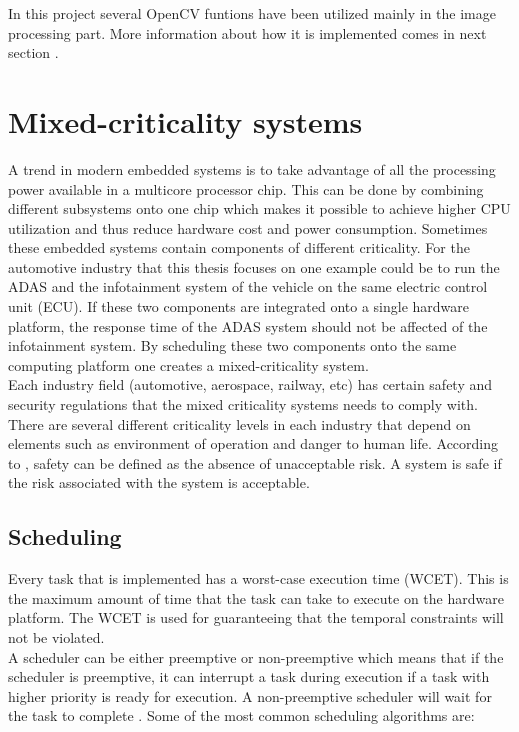 In this project several OpenCV funtions have been utilized mainly in the image processing part. More information about how it is implemented comes in next section \cite{opencv}.

\section{Mixed-criticality systems}
A trend in modern embedded systems is to take advantage of all the processing power available in a multicore processor chip. This can be done by combining different subsystems onto one chip which makes it possible to achieve higher CPU utilization and thus reduce hardware cost and power consumption. Sometimes these embedded systems contain components of different criticality. For the automotive industry that this thesis focuses on one example could be to run the ADAS and the infotainment system of the vehicle on the same electric control unit (ECU). If these two components are integrated onto a single hardware platform, the response time of the ADAS system should not be affected of the infotainment system. By scheduling these two components onto the same computing platform one creates a mixed-criticality system.\\

Each industry field (automotive, aerospace, railway, etc) has certain safety and security regulations that the mixed criticality systems needs to comply with. There are several different criticality levels in each industry that depend on elements such as environment of operation and danger to human life\cite{zaki2016}. According to \cite{SIL}, safety can be defined as the absence of unacceptable risk. A system is safe if the risk associated with the system is acceptable. 


\subsection{Scheduling}
Every task that is implemented has a worst-case execution time (WCET). This is the maximum amount of time that the task can take to execute on the hardware platform. The WCET is used for guaranteeing that the temporal constraints will not be violated.\\

A scheduler can be either preemptive or non-preemptive which means that if the scheduler is preemptive, it can interrupt a task during execution if a task with higher priority is ready for execution. A non-preemptive scheduler will wait for the task to complete \cite{RTSS}. Some of the most common scheduling algorithms are:

